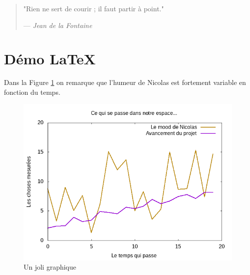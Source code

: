 \documentclass[french]{article}
\begin{document}
\begin{quotation}
	"Rien ne sert de courir ; il faut partir à point."

	--- \emph{Jean de la Fontaine}
\end{quotation}









\section{Démo \LaTeX}

Dans la Figure \ref{fig:test} on remarque que l'humeur de Nicolas est fortement variable en fonction du temps.

\begin{figure}[ht]
    \centering
    \includegraphics[width=1\textwidth]{test}
    \caption{Un joli graphique}
    \label{fig:test}
\end{figure}

\end{document}
